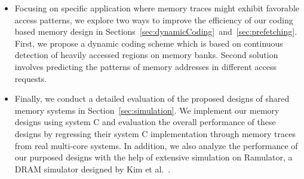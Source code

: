 \begin{itemize}
\item Focusing on specific application where memory traces might exhibit favorable access patterns, we explore two ways to improve the efficiency of our coding based memory design in Sections~\ref{sec:dynamicCoding}~and~\ref{sec:prefetching}. First, we propose a dynamic coding scheme which is based on continuous detection of heavily accessed regions on memory banks. 
Second solution involves predicting the patterns of memory addresses in different access requests. 
\item {\color{blue}Finally, we conduct a detailed evaluation of the proposed designs of shared memory systems in Section~\ref{sec:simulation}. We implement our memory designs using system C and evaluation the overall performance of these designs by regressing their system C implementation through memory traces from real multi-core systems. In addition, we also analyze the performance of our purposed designs with the help of extensive simulation on Ramulator, a DRAM simulator designed by Kim et al.~\cite{Ramulator}.} %
\end{itemize}

